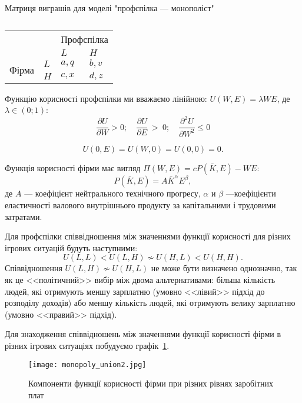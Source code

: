 \begin{table}[h]
	\centering
	\caption{}
		Матриця виграшів для моделі "профспілка --- монополіст"\\
		\normalsize
	\begin{tabular}{|l|l|l|l|}
		\hline
		\multicolumn{2}{|l|}{\multirow{2}{*}{}} & \multicolumn{2}{l|}{Профспілка} \\ \cline{3-4} 
		\multicolumn{2}{|l|}{}                  & $L$            & $H$            \\ \hline
		\multirow{2}{*}{Фірма}     & $L$     & $a,q$          & $b,v$          \\ \cline{2-4} 
		& $H$     & $c,x$          & $d,z$          \\ \hline
	\end{tabular}
	\label{tab:mono:prof}
\end{table}
Функцію корисності профспілки ми вважаємо лінійною: $U(W,E)=\lambda WE$, де $\lambda \in(0;1)$:
$$
	\frac{\partial U}{\partial W} > 0; 
	\quad 
	\frac{\partial U}{\partial E}~>~0 ; 
	\quad
	\frac{\partial^2 U}{\partial W^2} \leqslant 0
$$

$$
	U(0,E) = U(W,0) = U(0,0) = 0.
$$

Функція корисності фірми має вигляд $\Pi(W,E)=cP(\bar{K},E)-WE$:
$$P(\bar{K}, E)=A\bar{K}^\alpha E^\beta,$$ 
де $A$ --- коефіцієнт нейтрального технічного прогресу, $\alpha$ и $\beta$
---коефіцієнти еластичності валового внутрішнього продукту за капітальними і
трудовими затратами.

Для профспілки співвідношення між значеннями функції корисності для різних ігрових ситуацій
будуть наступними:
\begin{equation}
U(L,L) < U(L,H) \nsim U(H, L) < U(H,H).
\end{equation}
Співвідношення $U(L,H) \nsim U(H, L)$ не може бути визначено однозначно, так
як це <<політичний>> вибір між двома альтернативами: більша кількість
людей, які отримують меншу зарплатню (умовно <<лівий>> підхід до розподілу
доходів) або меншу кількість людей, які отримують велику зарплатню (умовно
<<правий>> підхід).

Для знаходження співвідношень між значеннями функції корисності фірми в різних ігрових ситуаціях
побудуємо графік~\ref{fig:monopoly_union1}.

\begin{figure}[h]
	\texttt{[image: monopoly\_union2.jpg]}
	\caption{Компоненти функції корисності фірми при різних рівнях заробітних плат}
	\label{fig:monopoly_union1}
\end{figure}

